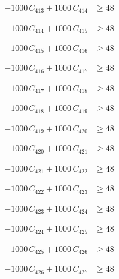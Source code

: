 \documentclass[a4paper,11pt]{article}
\begin{document}
\begin{align}
-1000\,C_{413} + 1000\,C_{414} &\geq 48 \nonumber
\end{align}

\begin{align}
-1000\,C_{414} + 1000\,C_{415} &\geq 48 \nonumber
\end{align}

\begin{align}
-1000\,C_{415} + 1000\,C_{416} &\geq 48 \nonumber
\end{align}

\begin{align}
-1000\,C_{416} + 1000\,C_{417} &\geq 48 \nonumber
\end{align}

\begin{align}
-1000\,C_{417} + 1000\,C_{418} &\geq 48 \nonumber
\end{align}

\begin{align}
-1000\,C_{418} + 1000\,C_{419} &\geq 48 \nonumber
\end{align}

\begin{align}
-1000\,C_{419} + 1000\,C_{420} &\geq 48 \nonumber
\end{align}

\begin{align}
-1000\,C_{420} + 1000\,C_{421} &\geq 48 \nonumber
\end{align}

\begin{align}
-1000\,C_{421} + 1000\,C_{422} &\geq 48 \nonumber
\end{align}

\begin{align}
-1000\,C_{422} + 1000\,C_{423} &\geq 48 \nonumber
\end{align}

\begin{align}
-1000\,C_{423} + 1000\,C_{424} &\geq 48 \nonumber
\end{align}

\begin{align}
-1000\,C_{424} + 1000\,C_{425} &\geq 48 \nonumber
\end{align}

\begin{align}
-1000\,C_{425} + 1000\,C_{426} &\geq 48 \nonumber
\end{align}

\begin{align}
-1000\,C_{426} + 1000\,C_{427} &\geq 48 \nonumber
\end{align}
\end{document}
